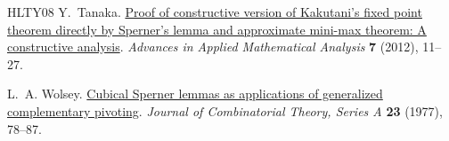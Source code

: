 \documentclass[11pt]{amsart}
\theoremstyle{definition}
\theoremstyle{remark}
\numberwithin{equation}{section}
\begin{document}
\begin{thebibliography}{HLTY08}
Y.~Tanaka.
\href{https://www.ripublication.com/Volume/aamav7n1.htm}{Proof of constructive version of Kakutani's fixed point theorem directly by Sperner's lemma and approximate mini-max theorem: A constructive analysis}.
\emph{Advances in Applied Mathematical Analysis} \textbf{7} (2012), 11--27.

L.~A. Wolsey.
\href{https://doi.org/10.1016/0097-3165(77)90081-4}{Cubical Sperner lemmas as applications of generalized complementary pivoting}.
\emph{Journal of Combinatorial Theory, Series A} \textbf{23} (1977), 78--87.

\end{thebibliography}
\end{document}
